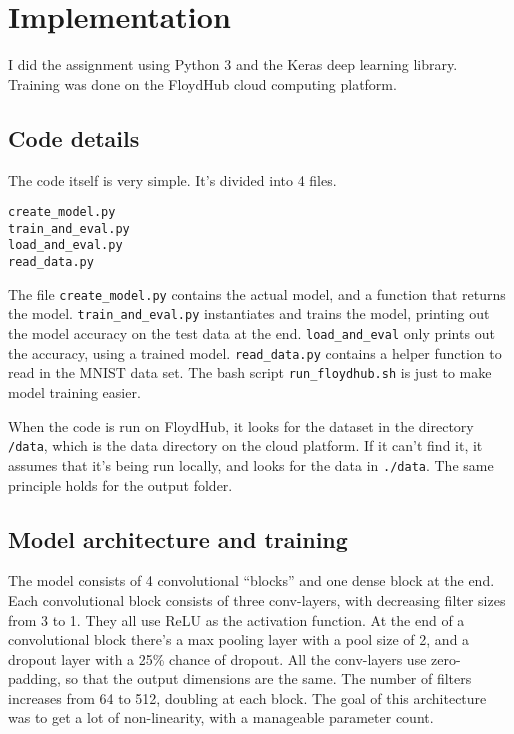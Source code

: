 
\section{Implementation}

I did the assignment using Python 3 and the Keras deep learning library.
Training was done on the FloydHub cloud computing platform.

\subsection{Code details}

The code itself is very simple. It's divided into 4 files.
\begin{verbatim}
create_model.py
train_and_eval.py
load_and_eval.py
read_data.py
\end{verbatim}
The file \verb|create_model.py| contains the actual model, and a function that
returns the model. \verb|train_and_eval.py| instantiates and trains the model,
printing out the model accuracy on the test data at the end.
\verb|load_and_eval| only prints out the accuracy, using a trained model.
\verb|read_data.py| contains a helper function to read in the MNIST data set.
The bash script \verb|run_floydhub.sh| is just to make model training easier.

When the code is run on FloydHub, it looks for the dataset in the directory
\verb|/data|, which is the data directory on the cloud platform. If it can't
find it, it assumes that it's being run locally, and looks for the data in
\verb|./data|. The same principle holds for the output folder.

\subsection{Model architecture and training}

The model consists of 4 convolutional ``blocks'' and one dense block at the
end. Each convolutional block consists of three conv-layers, with decreasing
filter sizes from 3 to 1. They all use ReLU as the activation function. At the
end of a convolutional block there's a max pooling layer with a pool size of 2,
and a dropout layer with a \num{25}\% chance of dropout. All the conv-layers
use zero-padding, so that the output dimensions are the same. The number of
filters increases from 64 to 512, doubling at each block. The goal of this
architecture was to get a lot of non-linearity, with a manageable parameter
count.

